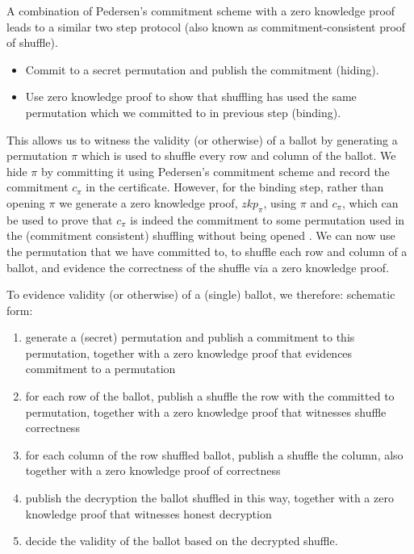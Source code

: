 \documentclass{llncs}
\begin{document}
A combination of Pedersen's commitment scheme 
with a zero knowledge proof leads to a similar two step protocol (also known 
as commitment-consistent proof of shuffle)\cite{Wikstrom:2009:CPS}.

\begin{itemize}
\item Commit to a secret permutation and publish the commitment (hiding).
\item Use zero knowledge proof to show that shuffling has used 
      the same permutation which we committed to in previous step (binding).
\end{itemize}  

\noindent
This allows us to witness the validity (or otherwise) of a ballot by generating a 
permutation $\pi$ which is used to shuffle every row and column of the ballot.
We hide $\pi$ by committing it using Pedersen's 
commitment scheme 
and record the commitment $c_{\pi}$ in the certificate. However, for the binding step, rather 
than opening $\pi$ we generate a zero knowledge proof, $zkp_{\pi}$, 
using $\pi$ and $c_{\pi}$, which can 
be  used to prove that $c_{\pi}$ is indeed the commitment to some permutation
used in the (commitment consistent) shuffling 
 without being opened \cite{Wikstrom:2009:CPS}. We can now use the
 permutation that we have committed to, to 
shuffle each row and column of a ballot, and evidence the
correctness of the shuffle via a zero knowledge proof.

To evidence validity (or otherwise) of a (single) ballot, we
therefore:
schematic form:
\begin{enumerate}
  \item generate a (secret) permutation and publish a commitment to this
  permutation, together with a zero knowledge proof that evidences commitment
  to a permutation
  \item for each row of the ballot, publish a shuffle the row with
  the committed to permutation, together with a zero knowledge proof
  that witnesses shuffle correctness
  \item for each column of the row shuffled ballot, publish a
  shuffle the column, also together with a zero knowledge proof of
  correctness 
  \item publish the decryption the ballot shuffled in this way, together with a
  zero knowledge proof that witnesses honest decryption
  \item decide the validity of the ballot based on the decrypted
  shuffle.
\end{enumerate}
\end{document}

